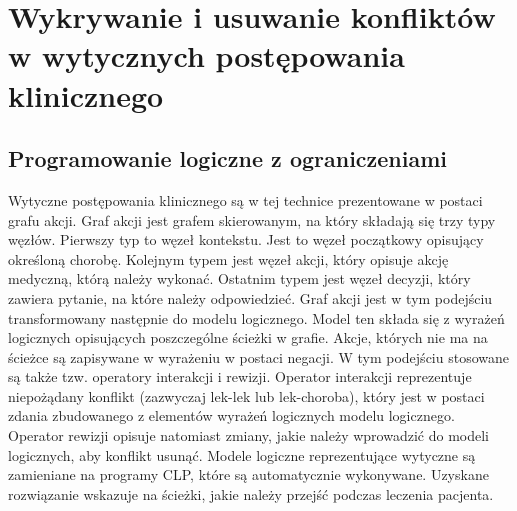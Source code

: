 
\section{Wykrywanie i usuwanie konfliktów w wytycznych postępowania klinicznego}

\subsection{Programowanie logiczne z ograniczeniami}
Wytyczne postępowania klinicznego są w tej technice prezentowane w postaci grafu akcji.\cite{SzWilk2} Graf akcji jest grafem skierowanym, na który składają się trzy typy węzłów. Pierwszy typ to węzeł kontekstu. Jest to węzeł początkowy opisujący określoną chorobę. Kolejnym typem jest węzeł akcji, który opisuje akcję medyczną, którą należy wykonać. Ostatnim typem jest węzeł decyzji, który zawiera pytanie, na które należy odpowiedzieć. Graf akcji jest w tym podejściu transformowany następnie do modelu logicznego. Model ten składa się z wyrażeń logicznych opisujących poszczególne ścieżki w grafie. Akcje, których nie ma na ścieżce   są zapisywane w wyrażeniu w postaci negacji. W tym podejściu stosowane są także tzw. operatory interakcji i rewizji. Operator interakcji reprezentuje niepożądany konflikt (zazwyczaj lek-lek lub lek-choroba), który jest w postaci zdania zbudowanego z elementów wyrażeń logicznych modelu logicznego. Operator rewizji opisuje natomiast zmiany, jakie należy wprowadzić do modeli logicznych, aby konflikt usunąć. Modele logiczne reprezentujące wytyczne są zamieniane na programy CLP, które są automatycznie wykonywane. Uzyskane rozwiązanie wskazuje na ścieżki, jakie należy przejść podczas leczenia pacjenta.


